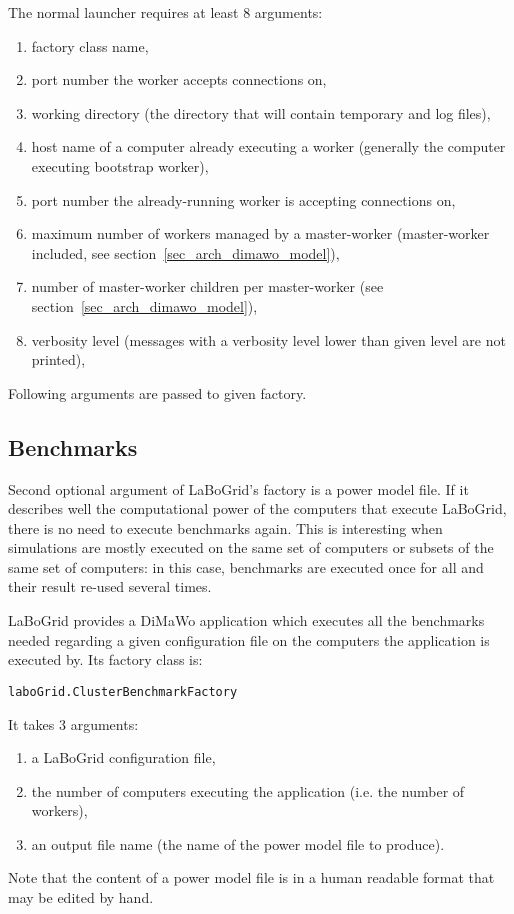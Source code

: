 The normal launcher requires at least 8 arguments:
%
\begin{enumerate}
	\item factory class name,
	\item port number the worker accepts connections on,
	\item working directory (the directory that will contain temporary and
	log files),
	\item host name of a computer already executing a worker (generally the
	computer executing bootstrap worker),
	\item port number the already-running worker is accepting connections on,
	\item maximum number of workers managed by a master-worker
	(master-worker included, see section~\ref{sec_arch_dimawo_model}),
	\item number of master-worker children per master-worker (see
	section~\ref{sec_arch_dimawo_model}),
	\item verbosity level (messages with a verbosity level lower than given level
	are not printed),
\end{enumerate}
%
Following arguments are passed to given factory.


\subsection{Benchmarks}

Second optional argument of LaBoGrid's factory is a power model file. If it
describes well the computational power of the computers that execute LaBoGrid,
there is no need to execute benchmarks again. This is interesting when
simulations are mostly executed on the same set of computers or subsets of the
same set of computers: in this case, benchmarks are executed once for all and
their result re-used several times.

LaBoGrid provides a DiMaWo application which executes all the benchmarks
nee\-ded regarding a given configuration file on the computers the application
is executed by. Its factory class is:
%
\begin{center}
\texttt{laboGrid.ClusterBenchmarkFactory}
\end{center}
%
It takes 3 arguments:
\begin{enumerate}
	\item a LaBoGrid configuration file,
	\item the number of computers executing the application (i.e. the number
	of workers),
	\item an output file name (the name of the power model file to produce).
\end{enumerate}

Note that the content of a power model file is in a human readable format that
may be edited by hand.

